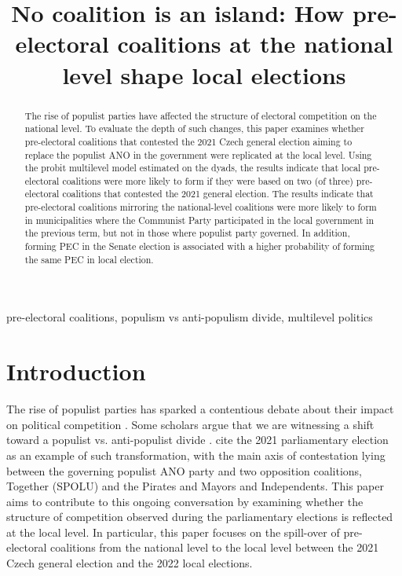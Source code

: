 \documentclass[]{interact}
\theoremstyle{plain}%
\theoremstyle{definition}
\theoremstyle{remark}
\begin{document}
\title{No coalition is an island: How pre-electoral coalitions at the national level shape local elections}

\author{
}

\maketitle

\begin{abstract}
The rise of populist parties have affected the structure of electoral competition on the national level. To evaluate the depth of such changes, this paper examines whether pre-electoral coalitions that contested the 2021 Czech general election aiming to replace the populist ANO in the government were replicated at the local level. 
Using the probit multilevel model estimated on the dyads, the results indicate that local pre-electoral coalitions were more likely to form if they were based on two (of three) pre-electoral coalitions that contested the 2021 general election. The results indicate that pre-electoral coalitions mirroring the national-level coalitions were more likely to form in municipalities where the Communist Party participated in the local government in the previous term, but not in those where populist party governed. In addition, forming PEC in the Senate election is associated with a higher probability of forming the same PEC in local election.
\end{abstract}

\begin{keywords}
pre-electoral coalitions, populism vs anti-populism divide, multilevel politics
\end{keywords}


\section{Introduction}

The rise of populist parties has sparked a contentious debate about their impact on political competition \citep[e.g.][]{vachudova2021,moffitt2018}. Some scholars argue that we are witnessing a shift toward a populist vs. anti-populist divide \citep{moffitt2018}. \citet{havlik2022} cite the 2021 parliamentary election as an example of such transformation, with the main axis of contestation lying between the governing populist ANO party and two opposition coalitions, Together (SPOLU) and the Pirates and Mayors and Independents. This paper aims to contribute to this ongoing conversation by examining whether the structure of competition observed during the parliamentary elections is reflected at the local level. In particular, this paper focuses on the spill-over of pre-electoral coalitions from the national level to the local level between the 2021 Czech general election and the 2022 local elections. 
\end{document}
